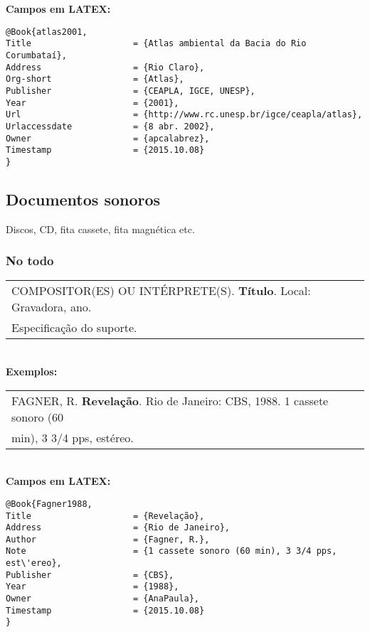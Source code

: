 \textbf{Campos em LATEX:} 

\begin{verbatim}
@Book{atlas2001,
Title                    = {Atlas ambiental da Bacia do Rio Corumbataí},
Address                  = {Rio Claro},
Org-short                = {Atlas},
Publisher                = {CEAPLA, IGCE, UNESP},
Year                     = {2001},
Url                      = {http://www.rc.unesp.br/igce/ceapla/atlas},
Urlaccessdate            = {8 abr. 2002},
Owner                    = {apcalabrez},
Timestamp                = {2015.10.08}
}
\end{verbatim}

\subsection{Documentos sonoros}

Discos, CD, fita cassete, fita magn\'etica etc. \\
\subsubsection{No todo}

\begin{tabular}{|l|c|} \hline
	COMPOSITOR(ES) OU INTÉRPRETE(S). \textbf{Título}. Local: Gravadora, ano. \\
	Especificação do suporte. 
	\\\hline
\end{tabular} \\

\textbf{Exemplos:} \\

\begin{tabular}{|l|c|} \hline
	FAGNER, R. \textbf{Revelação}. Rio de Janeiro: CBS, 1988. 1 cassete sonoro (60 \\
	min), 3 3/4 pps, est\'ereo.  
	\\\hline
\end{tabular} \\

\textbf{Campos em LATEX:} 

\begin{verbatim}
@Book{Fagner1988,
Title                    = {Revelação},
Address                  = {Rio de Janeiro},
Author                   = {Fagner, R.},
Note                     = {1 cassete sonoro (60 min), 3 3/4 pps, 
est\'ereo},
Publisher                = {CBS},
Year                     = {1988},
Owner                    = {AnaPaula},
Timestamp                = {2015.10.08}
}
\end{verbatim}

